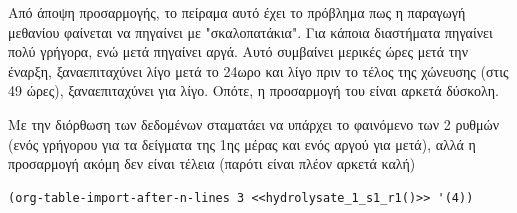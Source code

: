 \documentclass[11pt]{article}
\begin{document}
Από άποψη προσαρμογής, το πείραμα αυτό έχει το πρόβλημα πως η παραγωγή μεθανίου φαίνεται να πηγαίνει με "σκαλοπατάκια". Για κάποια διαστήματα πηγαίνει πολύ γρήγορα, ενώ μετά πηγαίνει αργά. Αυτό συμβαίνει μερικές ώρες μετά την έναρξη, ξαναεπιταχύνει λίγο μετά το 24ωρο και λίγο πριν το τέλος της χώνευσης (στις 49 ώρες), ξαναεπιταχύνει για λίγο. Οπότε, η προσαρμογή του είναι αρκετά δύσκολη.

Με την διόρθωση των δεδομένων σταματάει να υπάρχει το φαινόμενο των 2 ρυθμών (ενός γρήγορου για τα δείγματα της 1ης μέρας και ενός αργού για μετά), αλλά η προσαρμογή ακόμη δεν είναι τέλεια (παρότι είναι πλέον αρκετά καλή)

\begin{verbatim}
(org-table-import-after-n-lines 3 <<hydrolysate_1_s1_r1()>> '(4))
\end{verbatim}
\end{document}
